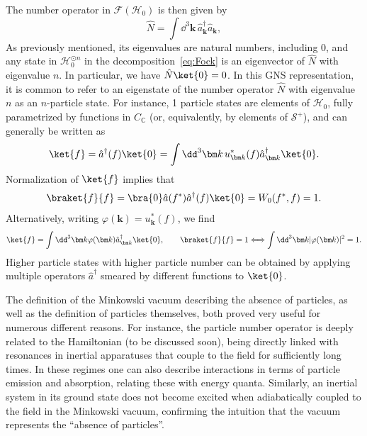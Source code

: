 \documentclass[letterpaper,12pt,titlepage,oneside,final]{book}
\renewcommand{\S}{\mathcal{S}}
\newcommand{\trr}[1]{\textcolor{red}{#1}}
\begin{document}
The number operator in $\mathcal{F}(\mathscr{H}_0)$ is then given by
\begin{equation}
    \hat{N} = \int \dd^3 \bm k\, \hat{a}^\dagger_{\bm k} \hat{a}_{\bm k},
\end{equation}
As previously mentioned, its eigenvalues are natural numbers, including $0$, and any state in $\mathscr{H}_0^{\odot n}$ in the decomposition~\eqref{eq:Fock} is an eigenvector of $\hat{N}$ with eigenvalue $n$. In particular, we have $\hat{N}\ket{0} = 0$. In this GNS representation, it is common to refer to an eigenstate of the number operator $\hat{N}$ with eigenvalue $n$ as an $n$-particle state. For instance, 1 particle states are elements of $\mathscr{H}_0$, fully parametrized by functions in $C_{\mathbb{C}}$ (or, equivalently, by elements of $\S^+$), and can generally be written as
\begin{equation}
    \ket{f} = \hat{a}^\dagger(f)\ket{0} = \int \dd^3\bm k \,u_{\bm k}^*(f)\hat{a}_{\bm k}^\dagger \ket{0}.
\end{equation}
Normalization of $\ket{f}$ implies that
\begin{equation}
    \braket{f}{f} = \bra{0}\hat{a}(f^*)\hat{a}^\dagger(f)\ket{0} = W_0(f^*,f) = 1.
\end{equation}
Alternatively, writing $\varphi(\bm k) = u_{\bm k}^*(f)$, we find
\begin{equation}\label{eq:norm1part}
    \ket{f} = \int \dd^3\bm k \varphi(\bm k) \hat{a}_{\bm k}^\dagger \ket{0}, \quad \quad \braket{f}{f} = 1 \Longleftrightarrow \int \dd^3\bm k |\varphi(\bm k)|^2 = 1.
\end{equation}
Higher particle states with higher particle number can be obtained by applying multiple operators $\hat{a}^\dagger$ smeared by different functions to $\ket{0}$. %

The definition of the Minkowski vacuum describing the absence of particles, as well as the definition of particles themselves, both proved very useful for numerous different reasons. For instance, the particle number operator is deeply related to the Hamiltonian (to be discussed soon), being directly linked with resonances in inertial apparatuses that couple to the field for sufficiently long times. In these regimes one can also describe interactions in terms of particle emission and absorption, relating these with energy quanta. Similarly, an inertial system in its ground state {does not become excited} when adiabatically coupled to the field in the Minkowski vacuum, confirming the intuition that the vacuum represents the ``absence of particles''.
\end{document}

